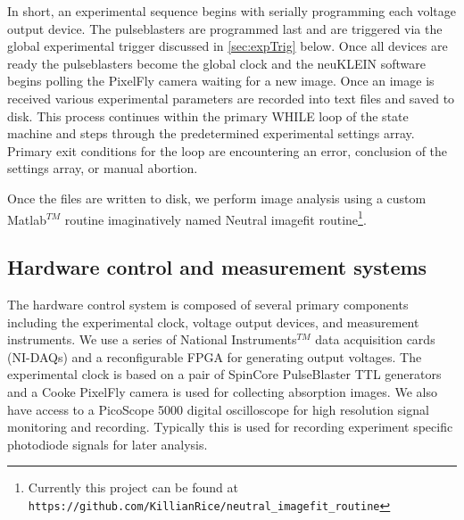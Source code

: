 In short, an experimental sequence begins with serially programming each voltage output device.
The pulseblasters are programmed last and are triggered via the global experimental trigger discussed in \ref{sec:expTrig} below.
Once all devices are ready the pulseblasters become the global clock and the neuKLEIN software begins polling the PixelFly camera waiting for a new image.
Once an image is received various experimental parameters are recorded into text files and saved to disk.
This process continues within the primary WHILE loop of the state machine and steps through the predetermined experimental settings array.
Primary exit conditions for the loop are encountering an error, conclusion of the settings array, or manual abortion.

Once the files are written to disk, we perform image analysis using a custom Matlab$^{TM}$ routine imaginatively named Neutral imagefit routine\footnote{Currently this project can be found at \texttt{https://github.com/KillianRice/neutral\_imagefit\_routine}}.

\subsection{Hardware control and measurement systems} \label{ssec:comp_sys}
The hardware control system is composed of several primary components including the experimental clock, voltage output devices, and measurement instruments.
We use a series of National Instruments$^{TM}$ data acquisition cards (NI-DAQs) and a reconfigurable FPGA for generating output voltages.
The experimental clock is based on a pair of SpinCore PulseBlaster TTL generators and a Cooke PixelFly camera is used for collecting absorption images.
We also have access to a PicoScope 5000 digital oscilloscope for high resolution signal monitoring and recording. Typically this is used for recording experiment specific photodiode signals for later analysis.

